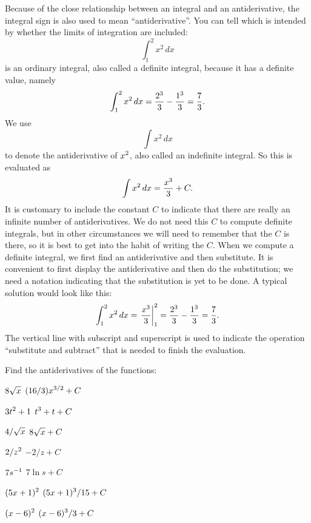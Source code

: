 Because of the close relationship between an integral and an
antiderivative, the integral sign is also used to mean
``antiderivative''. You can tell which is intended by whether the
limits of integration are included:
$$
  \int_1^2 x^2\,dx
$$
is an ordinary integral, also called a 
{\dfont definite integral\/},
because it has a definite value, namely
$$
  \int_1^2 x^2\,dx={2^3\over3}-{1^3\over3}={7\over3}.
$$
We use
$$
  \int x^2\,dx
$$
to denote the antiderivative of $\displaystyle x^2$, also called an
{\dfont indefinite integral\/}.
So this is evaluated as
$$
  \int x^2\,dx = {x^3\over 3}+C.
$$
It is customary to include the constant $C$ to indicate that there are
really an infinite number of antiderivatives. We do not need this $C$
to compute definite integrals, but in other circumstances we will need
to remember that the $C$ is there, so it is best to get into the habit
of writing the $C$.
When we compute a definite integral, we first find an antiderivative
and then substitute. It is convenient to first display the
antiderivative and then do the substitution; we need a notation
indicating that the substitution is yet to be done. A typical solution
would look like this:
$$
  \int_1^2 x^2\,dx=\left.{x^3\over 3}\right|_1^2 = 
  {2^3\over3}-{1^3\over3}={7\over3}.
$$
The vertical line with subscript and superscript is used to indicate
the operation ``substitute and subtract'' that is needed to finish the
evaluation. 

\exercises

Find the antiderivatives of the functions:

\twocol

\exercise $\displaystyle 8\sqrt{x}$
\answer $\displaystyle (16/3)x^{3/2}+C$
\endanswer
\endexercise

\exercise $\displaystyle 3t^2+1$
\answer $\displaystyle t^3+t+C$
\endanswer
\endexercise

\exercise $\displaystyle 4/\sqrt{x}$
\answer $\displaystyle 8\sqrt{x}+C$
\endanswer
\endexercise

\exercise $\displaystyle 2/z^2$
\answer $-2/z+C$
\endanswer
\endexercise

\iflatetranscendentals
\elselatetranscendentals

\exercise $\displaystyle 7s^{-1}$
\answer $7\ln s+C$
\endanswer
\endexercise
\filatetranscendentals

\exercise $\displaystyle (5x+1)^2$
\answer $\displaystyle (5x+1)^3/15+C$
\endanswer
\endexercise

\exercise $\displaystyle (x-6)^2$
\answer $\displaystyle (x-6)^3/3+C$
\endanswer
\endexercise


